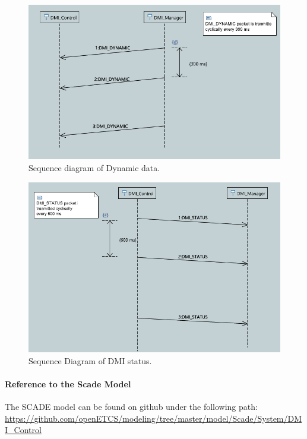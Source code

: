     \begin{figure}
      \centering
      \includegraphics[scale=0.5]{images/DynamicPacket_SeqDia}
      \caption{ Sequence diagram of Dynamic data.}\label{fig:SeqDiaDyn}
    \end{figure}
  
    \begin{figure}
      \centering
      \includegraphics[scale=0.5]{images/DMIStatus_SeqDia}
      \caption{Sequence Diagram of DMI status.}\label{fig:SeqDiaStatus}
     \end{figure}
     

\paragraph{Reference to the Scade Model}

The SCADE model can be found on github under the following path: \url{https://github.com/openETCS/modeling/tree/master/model/Scade/System/DMI_Control}